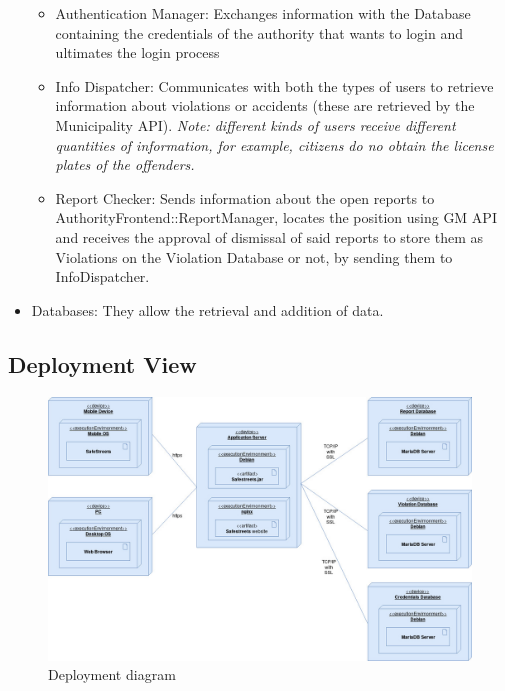 \begin{itemize}
\begin{itemize}
            \item Authentication Manager: Exchanges information with the Database containing the credentials of the authority that wants to login
                and ultimates the login process
            
            \item Info Dispatcher: Communicates with both the types of users to retrieve information about violations or accidents (these are 
                retrieved by the Municipality API). \textit{Note: different kinds of users receive different quantities of information, for example, 
                citizens do no obtain the license plates of the offenders.}

            \item Report Checker: Sends information about the open reports to AuthorityFrontend::ReportManager, 
                locates the position using GM API and receives the approval of dismissal of said reports to store them as 
                Violations on the Violation Database or not, by sending them to InfoDispatcher.

        \end{itemize}
        
        \item Databases: They allow the retrieval and addition of data.
        
    \end{itemize}

\newpage



\subsection{Deployment View}

    \begin{figure}[H]

        \includegraphics[width=\textwidth]{Images/deployment.jpg}
        \caption{\label{fig:deployment}Deployment diagram}
        
    \end{figure}
	
